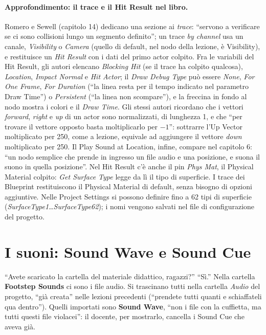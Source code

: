 \paragraph{Approfondimento: il trace e il Hit Result nel libro.} Romero e Sewell
(capitolo 14) dedicano una sezione ai \emph{trace}: ``servono a verificare se ci sono
collisioni lungo un segmento definito''; un trace \emph{by channel} usa un canale,
\emph{Visibility} o \emph{Camera} (quello di default, nel nodo della lezione, è
Visibility), e restituisce un \emph{Hit Result} con i dati del primo actor colpito. Fra le
variabili del Hit Result, gli autori elencano \emph{Blocking Hit} (se il trace ha colpito
qualcosa), \emph{Location}, \emph{Impact Normal} e \emph{Hit Actor}; il \emph{Draw Debug
Type} può essere \emph{None}, \emph{For One Frame}, \emph{For Duration} (``la linea resta
per il tempo indicato nel parametro Draw Time'') o \emph{Persistent} (``la linea non
scompare''), e la freccina in fondo al nodo mostra i colori e il \emph{Draw Time}. Gli
stessi autori ricordano che i vettori \emph{forward}, \emph{right} e \emph{up} di un actor
sono normalizzati, di lunghezza 1, e che ``per trovare il vettore opposto basta
moltiplicarlo per $-1$'': sottrarre l'Up Vector moltiplicato per 250, come a lezione,
equivale ad aggiungere il vettore \emph{down} moltiplicato per 250. Il Play Sound at
Location, infine, compare nel capitolo 6: ``un nodo semplice che prende in ingresso un
file audio e una posizione, e suona il suono in quella posizione''. Nel Hit Result c'è
anche il pin \emph{Phys Mat}, il Physical Material colpito: \emph{Get Surface Type} legge
da lì il tipo di superficie. I trace dei Blueprint restituiscono il Physical Material di
default, senza bisogno di opzioni aggiuntive. Nelle Project Settings si possono definire
fino a 62 tipi di superficie (\emph{SurfaceType1}\dots\emph{SurfaceType62}); i nomi
vengono salvati nel file di configurazione del progetto.

\section{I suoni: Sound Wave e Sound Cue}
\label{ue10:sec:suoni}

``Avete scaricato la cartella del materiale didattico, ragazzi?'' ``Sì.'' Nella cartella
\textbf{Footstep Sounds} ci sono i file audio. Si trascinano tutti nella cartella
\emph{Audio} del progetto, ``già creata'' nelle lezioni precedenti (``prendete tutti
quanti e schiaffateli qua dentro''). Quelli importati sono \textbf{Sound Wave}, ``non i
file con la cuffietta, ma tutti questi file violacei'': il docente, per mostrarlo, cancella
i Sound Cue che aveva già.

